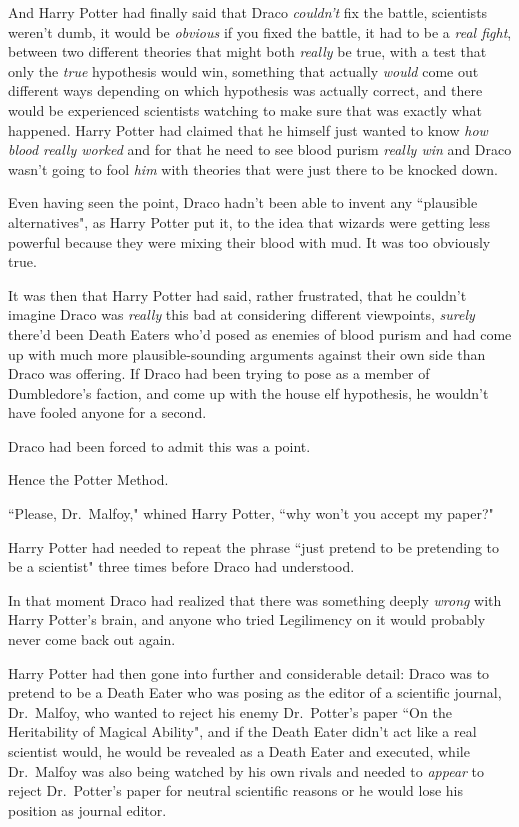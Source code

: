And Harry Potter had finally said that Draco \emph{couldn't} fix the battle, scientists weren't dumb, it would be \emph{obvious} if you fixed the battle, it had to be a \emph{real fight}, between two different theories that might both \emph{really} be true, with a test that only the \emph{true} hypothesis would win, something that actually \emph{would} come out different ways depending on which hypothesis was actually correct, and there would be experienced scientists watching to make sure that was exactly what happened. Harry Potter had claimed that he himself just wanted to know \emph{how blood really worked} and for that he need to see blood purism \emph{really win} and Draco wasn't going to fool \emph{him} with theories that were just there to be knocked down.

Even having seen the point, Draco hadn't been able to invent any ``plausible alternatives", as Harry Potter put it, to the idea that wizards were getting less powerful because they were mixing their blood with mud. It was too obviously true.

It was then that Harry Potter had said, rather frustrated, that he couldn't imagine Draco was \emph{really} this bad at considering different viewpoints, \emph{surely} there'd been Death Eaters who'd posed as enemies of blood purism and had come up with much more plausible-sounding arguments against their own side than Draco was offering. If Draco had been trying to pose as a member of Dumbledore's faction, and come up with the house elf hypothesis, he wouldn't have fooled anyone for a second.

Draco had been forced to admit this was a point.

Hence the Potter Method.

``Please, Dr.~Malfoy," whined Harry Potter, ``why won't you accept my paper?"

Harry Potter had needed to repeat the phrase ``just pretend to be pretending to be a scientist" three times before Draco had understood.

In that moment Draco had realized that there was something deeply \emph{wrong} with Harry Potter's brain, and anyone who tried Legilimency on it would probably never come back out again.

Harry Potter had then gone into further and considerable detail: Draco was to pretend to be a Death Eater who was posing as the editor of a scientific journal, Dr.~Malfoy, who wanted to reject his enemy Dr.~Potter's paper ``On the Heritability of Magical Ability", and if the Death Eater didn't act like a real scientist would, he would be revealed as a Death Eater and executed, while Dr.~Malfoy was also being watched by his own rivals and needed to \emph{appear} to reject Dr.~Potter's paper for neutral scientific reasons or he would lose his position as journal editor.

